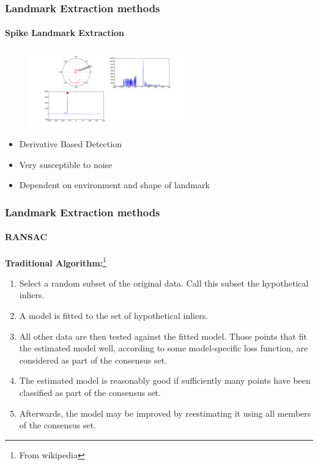 \documentclass{beamer}
\begin{document}
	\begin{frame}
		\frametitle{Landmark Extraction methods}
		\framesubtitle{Spike Landmark Extraction}
		\begin{figure}
			\includegraphics[width=0.6\textwidth,height=0.4\textheight]{spike}
		\end{figure}
		\begin{itemize}
			\item Derivative Based Detection
			\item Very susceptible to noise
			\item Dependent on environment and shape of landmark
		\end{itemize}
	\end{frame}

	\begin{frame}
		\frametitle{Landmark Extraction methods}
		\framesubtitle{RANSAC}
		\textbf{Traditional Algorithm:}\footnote{From wikipedia}
		\begin{enumerate}
		\item Select a random subset of the original data. Call this subset the hypothetical inliers.
		\item A model is fitted to the set of hypothetical inliers.
		\item All other data are then tested against the fitted model. Those points that fit the estimated model well, according to some model-specific loss function, are considered as part of the consensus set.
		\item The estimated model is reasonably good if sufficiently many points have been classified as part of the consensus set.
		\item Afterwards, the model may be improved by reestimating it using all members of the consensus set.
		\end{enumerate}
	\end{frame}
	
\end{document}

